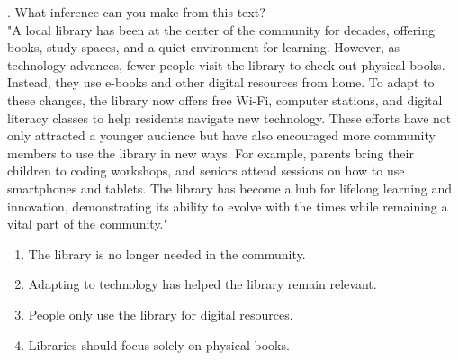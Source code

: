 \documentclass[12pt]{article}
\begin{document}
\vspace{1cm}
. What inference can you make from this text?\\
"A local library has been at the center of the community for decades, offering books, study spaces, and a quiet environment for learning. However, as technology advances, fewer people visit the library to check out physical books. Instead, they use e-books and other digital resources from home. To adapt to these changes, the library now offers free Wi-Fi, computer stations, and digital literacy classes to help residents navigate new technology. These efforts have not only attracted a younger audience but have also encouraged more community members to use the library in new ways. For example, parents bring their children to coding workshops, and seniors attend sessions on how to use smartphones and tablets. The library has become a hub for lifelong learning and innovation, demonstrating its ability to evolve with the times while remaining a vital part of the community."\\
\begin{enumerate}[label=\Alph*.]
    \item The library is no longer needed in the community.  
    \item Adapting to technology has helped the library remain relevant.  
    \item People only use the library for digital resources.  
    \item Libraries should focus solely on physical books.  
\end{enumerate}

\vspace{1em}
\end{document}
